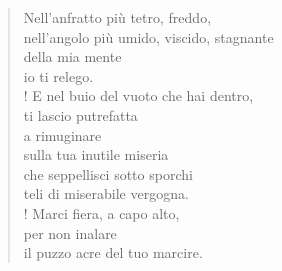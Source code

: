 
\begin{verse}
    Nell'anfratto più tetro, freddo,\\
    nell'angolo più umido, viscido, stagnante\\
    della mia mente\\
    io ti relego.\\!
    E nel buio del vuoto che hai dentro,\\
    ti lascio putrefatta\\
    a rimuginare\\
    sulla tua inutile miseria\\
    che seppellisci sotto sporchi\\
    teli di miserabile vergogna.\\!
    Marci fiera, a capo alto,\\
    per non inalare\\
    il puzzo acre del tuo marcire.
\end{verse}